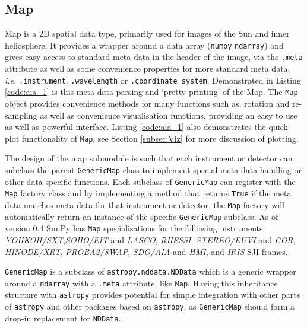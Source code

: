 \subsection{Map}
Map is a 2D spatial data type, primarily used for images of the Sun and 
inner heliosphere. It provides a wrapper around a data array (\texttt{numpy} 
\texttt{ndarray}) and gives easy access to standard meta data in the header of 
the image, via the \texttt{.meta} attribute as well as some convenience 
properties for more standard meta data, \textit{i.e.} \texttt{.instrument}, 
\texttt{.wavelength} or \texttt{.coordinate\_system}. Demonstrated in Listing 
\ref{code:aia_1} is this meta data parsing and `pretty printing' of the Map.
The \texttt{Map} object provides convenience methods for many functions 
such as, rotation and re-sampling as well as convenience visualisation 
functions, providing an easy to use as well as powerful interface.
Listing \ref{code:aia_1} also demonstrates the quick plot functionality of 
\texttt{Map}, see Section \ref{subsec:Viz} for more discussion of plotting.

The design of the map submodule is such that each instrument or 
detector can subclass the parent \texttt{GenericMap} class to implement 
special meta data handling or other data specific functions. Each subclass 
of \texttt{GenericMap} can register with the \texttt{Map} factory class and 
by implementing a method that returns \texttt{True} if the meta data 
matches meta data for that instrument or detector, the \texttt{Map} factory 
will automatically return an instance of the specific \texttt{GenericMap} 
subclass. As of version 0.4 SunPy has \texttt{Map} specialisations for the 
following instruments: 
\textit{YOHKOH/SXT},\textit{SOHO/EIT} and \textit{LASCO}, \textit{RHESSI}, 
\textit{STEREO/EUVI} and \textit{COR}, \textit{HINODE/XRT},
\textit{PROBA2/SWAP}, \textit{SDO/AIA} and \textit{HMI}, 
and \textit{IRIS} SJI frames.

\texttt{GenericMap} is a subclass of \texttt{astropy.nddata.NDData} which is a 
generic wrapper around a \texttt{ndarray} with a \texttt{.meta} attribute, like 
\texttt{Map}. Having this inheritance structure with \texttt{astropy} provides 
potential for simple integration with other parts of \texttt{astropy} and other 
packages based on \texttt{astropy}, as \texttt{GenericMap} should form a 
drop-in replacement for \texttt{NDData}.

